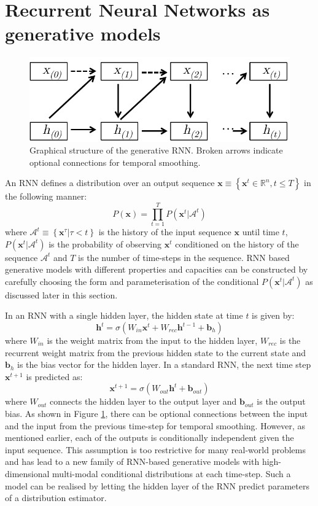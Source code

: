 \documentclass{article} %
\begin{document}
\section{Recurrent Neural Networks as generative models}
\label{RNN}
\begin{figure}
        \centering
    \includegraphics[scale=0.8]{RNN.pdf}
    \caption{Graphical structure of the generative RNN. Broken arrows indicate optional connections for temporal smoothing.}
    \label{fig:rnn}
\end{figure}


An RNN defines a distribution over an output sequence $ \mathbf{x} \equiv \left\{ \mathbf{x}^t \in \mathbb{R}^n, t \leq T \right\}$ in the following manner:
$$ P(\mathbf{x}) = \prod_{t=1}^{T} P(\mathbf{x}^t|\mathcal{A}^t)$$
where $\mathcal{A}^t \equiv \left\{ \mathbf{x}^{\tau}|\tau < t \right\}$ is the history of the input sequence $\mathbf{x}$ until time $t$, $P(\mathbf{x}^t|\mathcal{A}^t)$ is the probability of observing $\mathbf{x}^t$ conditioned on the history of the sequence $\mathcal{A}^t$ and $T$ is the number of time-steps in the sequence. RNN based generative models with different properties and capacities can be constructed by carefully choosing the form and parameterisation of the conditional $P(\mathbf{x}^t|\mathcal{A}^t)$ as discussed later in this section. 

In an RNN with a single hidden layer, the hidden state at time $t$ is given by:
\begin{equation}
\label{rnn-hidden}
\mathbf{h}^t = \sigma{(W_{in}\mathbf{x}^t + W_{rec}\mathbf{h}^{t-1} + \mathbf{b}_h)}
\end{equation}
where $W_{in}$ is the weight matrix from the input to the hidden layer, $W_{rec}$ is the recurrent weight matrix from the previous hidden state to the current state and $\mathbf{b}_h$ is the bias vector for the hidden layer. In a standard RNN, the next time step $\mathbf{x}^{t+1}$ is predicted as:
$$ \mathbf{x}^{t+1} = \sigma{(W_{out}\mathbf{h}^{t} + \mathbf{b}_{out})}$$  
where $W_{out}$ connects the hidden layer to the output layer and $\mathbf{b}_{out}$ is the output bias. As shown in Figure \ref{fig:rnn}, there can be optional connections between the input and the input from the previous time-step for temporal smoothing. However, as mentioned earlier, each of the outputs is conditionally independent given the input sequence. This assumption is too restrictive for many real-world problems and has lead to a new family of RNN-based generative models with high-dimensional multi-modal conditional distributions at each time-step. Such a model can be realised by letting the hidden layer of the RNN predict parameters of a distribution estimator. 
\end{document}
